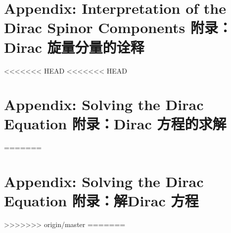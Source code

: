 \section[附录：Dirac 旋量分量的诠释]{Appendix: Interpretation of the Dirac Spinor Components 附录：Dirac 旋量分量的诠释}\label{sec8.8}
<<<<<<< HEAD
<<<<<<< HEAD
\section[附录：Dirac 方程的求解]{Appendix: Solving the Dirac Equation 附录：Dirac 方程的求解}\label{sec8.9}
=======

\section[附录：解Dirac 方程]{Appendix: Solving the Dirac Equation 附录：解Dirac 方程}\label{sec8.9}
>>>>>>> origin/master
=======

